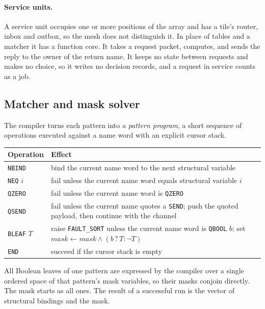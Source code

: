 \documentclass[10.5pt,a4paper]{extarticle}
\newcommand{\kw}[1]{\texttt{#1}}
\theoremstyle{definition}
\theoremstyle{remark}
\begin{document}
\paragraph{Service units.} A service unit occupies one or more positions of
the array and has a tile's router, inbox and outbox, so the mesh does not
distinguish it. In place of tables and a matcher it has a function core. It
takes a request packet, computes, and sends the reply to the owner of the
return name. It keeps no state between requests and makes no choice, so it
writes no decision records, and a request in service counts as a job.

\subsection{Matcher and mask solver}\label{sec:matcher}

The compiler turns each pattern into a \emph{pattern program}, a short
sequence of operations executed against a name word with an explicit cursor
stack.

\medskip\noindent
\begin{tabularx}{\textwidth}{@{}l X@{}}
\toprule
Operation & Effect\\
\midrule
\kw{NBIND}       & bind the current name word to the next structural variable\\
\kw{NEQ} $i$     & fail unless the current name word equals structural variable $i$\\
\kw{QZERO}       & fail unless the current name word is \kw{QZERO}\\
\kw{QSEND}       & fail unless the current name quotes a \kw{SEND}; push the
                   quoted payload, then continue with the channel\\
\kw{BLEAF} $T$   & raise \kw{FAULT\_SORT} unless the current name word is \kw{QBOOL} $b$;
                   set $\mathit{mask} \leftarrow \mathit{mask} \wedge
                   (b \mathrel{?} T : \neg T)$\\
\kw{END}         & succeed if the cursor stack is empty\\
\bottomrule
\end{tabularx}

\medskip\noindent
All Boolean leaves of one pattern are expressed by the compiler over a single
ordered space of that pattern's mask variables, so their masks conjoin
directly. The mask starts as all ones. The result of a successful run is the
vector of structural bindings and the mask.
\end{document}
